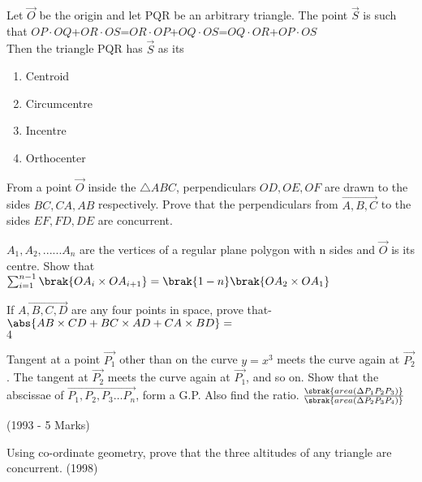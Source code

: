          \item %
		 Let $\vec{O}$ be the origin and let PQR be an arbitrary triangle. The point $\vec{S}$ is such that $OP\cdot OQ$+$OR\cdot OS$=$OR\cdot OP$+$OQ\cdot OS$=$OQ\cdot OR$+$OP\cdot OS$\\
Then the triangle PQR has $\vec{S}$ as its \hfill{}\\
\begin{enumerate}
        \item Centroid                             
        \item Circumcentre                           
        \item Incentre            
        \item Orthocenter\\          
\end{enumerate}
\item From a point $\vec{O}$ inside the $\triangle ABC$, perpendiculars $OD, OE, OF$ are drawn to the sides $BC, CA, AB$ respectively. Prove that the perpendiculars from $\vec{A,B,C}$ to the sides $EF, FD, DE$ are concurrent. \hfill{}
	\item $A_1,A_2,......A_n$ are the vertices of a regular plane polygon with n sides and $\vec{O}$ is its centre. Show that
	$\sum_{i=1}^{n-1}\brak{OA_i\times OA_{i+1}}= \brak{1-n}\brak{OA_2\times OA_1}$
		\hfill{}\\
	\item If $\vec{A,B,C,D}$ are any four points in space, prove that-
		$\abs{AB\times CD+ BC\times AD+CA\times BD}=$\\ $4$  \hfill{}\\
	\item Tangent at a point $\vec{P_{1}}$ {other than } on the curve $y=x^{3}$ meets the curve again at $\vec{P_{2}}$. The tangent at $\vec{P_{2}}$ meets the curve again at $\vec{P_{1}}$, and so on. Show that the abscissae of $\vec{P_{1}, P_{2}, P_{3} \dots P_{n}}$, form a G.P. Also find the ratio. $\frac{\sbrak{area(\Delta P_{1}P_{2}P_{3})}}{\sbrak{area(\Delta P_{2}P_{3}P_{4})}}$

	\hfill{(1993 - 5 Marks)}
\item Using co-ordinate geometry, prove that the three altitudes of any triangle are concurrent.
	\hfill{(1998)}
